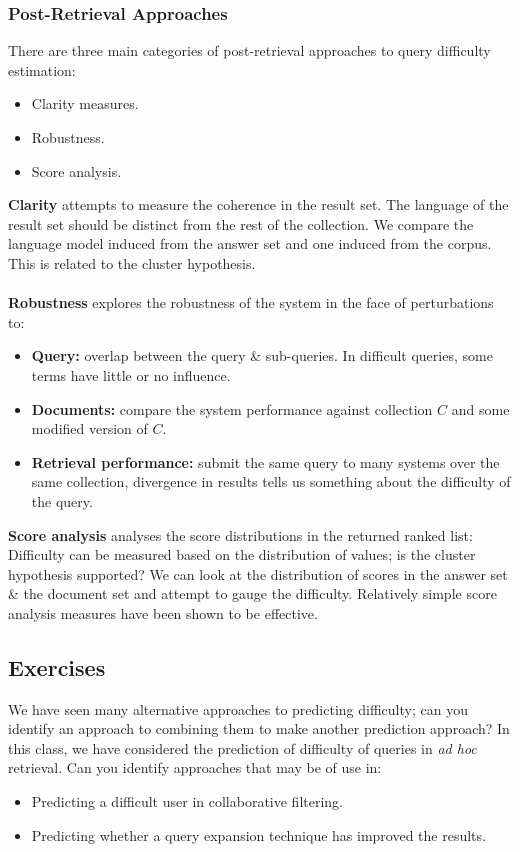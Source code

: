 \documentclass[a4paper,11pt]{article}
\begin{document}
\subsubsection{Post-Retrieval Approaches}
There are three main categories of post-retrieval approaches to query difficulty estimation:
\begin{itemize}
    \item   Clarity measures.
    \item   Robustness.
    \item   Score analysis.
\end{itemize}

\textbf{Clarity} attempts to measure the coherence in the result set.
The language of the result set should be distinct from the rest of the collection.
We compare the language model induced from the answer set and one induced from the corpus.
This is related to the cluster hypothesis.
\\\\
\textbf{Robustness} explores the robustness of the system in the face of perturbations to:
\begin{itemize}
    \item   \textbf{Query:} overlap between the query \& sub-queries.
            In difficult queries, some terms have little or no influence.
    \item   \textbf{Documents:} compare the system performance against collection $C$ and some modified version of $C$.
    \item   \textbf{Retrieval performance:} submit the same query to many systems over the same collection,
            divergence in results tells us something about the difficulty of the query.
\end{itemize}

\textbf{Score analysis} analyses the score distributions in the returned ranked list:
Difficulty can be measured based on the distribution of values; is the cluster hypothesis supported?
We can look at the distribution of scores in the answer set \& the document set and attempt to gauge the difficulty.
Relatively simple score analysis measures have been shown to be effective.

\subsection{Exercises}
We have seen many alternative approaches to predicting difficulty; can you identify an approach to combining them to make another prediction approach?
In this class, we have considered the prediction of difficulty of queries in \textit{ad hoc} retrieval.
Can you identify approaches that may be of use in:
\begin{itemize}
    \item   Predicting a difficult user in collaborative filtering.
    \item   Predicting whether a query expansion technique has improved the results.
\end{itemize}
\end{document}
